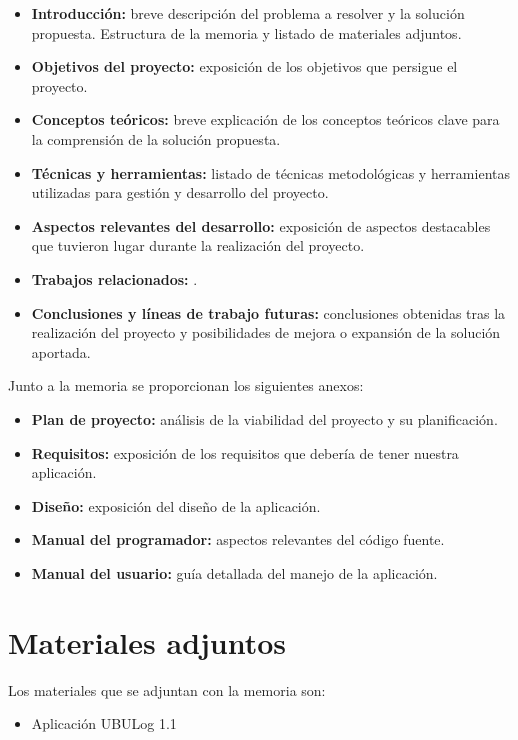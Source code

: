 \begin{itemize}
	\tightlist
	\item
	\textbf{Introducción:} breve descripción del problema a resolver y la
	solución propuesta. Estructura de la memoria y listado de materiales
	adjuntos.
	\item
	\textbf{Objetivos del proyecto:} exposición de los objetivos que
	persigue el proyecto.
	\item
	\textbf{Conceptos teóricos:} breve explicación de los conceptos
	teóricos clave para la comprensión de la solución propuesta.
	\item
	\textbf{Técnicas y herramientas:} listado de técnicas metodológicas y
	herramientas utilizadas para gestión y desarrollo del proyecto.
	\item
	\textbf{Aspectos relevantes del desarrollo:} exposición de aspectos
	destacables que tuvieron lugar durante la realización del proyecto.
	\item
	\textbf{Trabajos relacionados:} .
	\item
	\textbf{Conclusiones y líneas de trabajo futuras:} conclusiones
	obtenidas tras la realización del proyecto y posibilidades de mejora o
	expansión de la solución aportada.
\end{itemize}

Junto a la memoria se proporcionan los siguientes anexos:

\begin{itemize}
	\tightlist
	\item
	\textbf{Plan de proyecto:} análisis de la viabilidad del proyecto y su planificación.
	\item
	\textbf{Requisitos:} exposición de los requisitos que debería de tener nuestra aplicación.
	\item
	\textbf{Diseño:} exposición del diseño de la aplicación.
	\item
	\textbf{Manual del programador:} aspectos relevantes del código fuente.
	\item
	\textbf{Manual del usuario:} guía detallada del manejo de la aplicación.
\end{itemize}

\section{Materiales adjuntos}\label{materiales-adjuntos}

Los materiales que se adjuntan con la memoria son: 

\begin{itemize}
	\tightlist
	\item
	Aplicación UBULog 1.1
\end{itemize}

